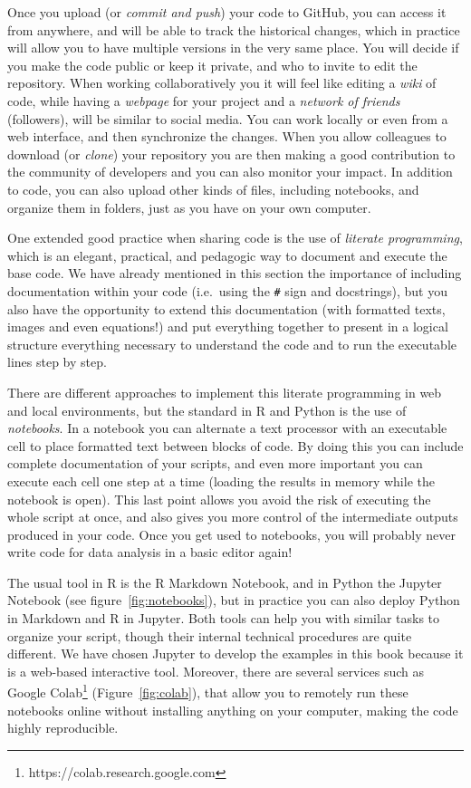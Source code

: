 Once you upload (or \textit{commit and push}) your code to GitHub, you can access it from anywhere, and will be able to track the historical changes, which in practice will allow you to have multiple versions in the very same place. You will decide if you make the code public or keep it private, and who to invite to edit the repository. When working collaboratively you it will feel like editing a \textit{wiki} of code, while having a \textit{webpage} for your project and a \textit{network of friends} (followers), will be similar to social media. You can work locally or even from a web interface, and then synchronize the changes. When you allow colleagues to download (or \textit{clone}) your repository you are then making a good contribution to the community of developers and you can also monitor your impact. In addition to code, you can also upload other kinds of files, including notebooks, and organize them in folders, just as you have  on your own computer.

One extended good practice when sharing code is the use of \textit{literate programming}, which is an elegant, practical, and pedagogic way to document and execute the base code. We have already mentioned in this section the importance of including documentation within your code (i.e.\ using the \texttt{\#} sign and docstrings), but you also have the opportunity to extend this documentation (with formatted texts, images and even equations!) and put everything together to present in a logical structure everything necessary to understand the code and to run the executable lines step by step.

There are different approaches to implement this literate programming in web and local environments, but the standard in R and Python is the use of \textit{notebooks}. In a notebook you can alternate a text processor with an executable cell to place formatted text between blocks of code. By doing this you can include complete documentation of your scripts, and even more important you can execute each cell one step at a time (loading the results in memory while the notebook is open). This last point allows you avoid the risk of executing the whole script at once, and also gives you more control of the intermediate outputs produced in your code. Once you get used to notebooks, you will probably never write code for data analysis in a basic editor again!

The usual tool in R is the R Markdown Notebook, and in Python the Jupyter Notebook (see figure~\ref{fig:notebooks}), but in practice you can also deploy Python in Markdown and R in Jupyter. Both tools can help you with similar tasks to organize your script, though their internal technical procedures are quite different. We have chosen Jupyter to develop the examples in this book because it is a web-based interactive tool. Moreover, there are several services such as Google Colab\footnote{https://colab.research.google.com} (Figure~\ref{fig:colab}), that allow you to remotely run these notebooks online without installing anything on your computer, making the code highly reproducible.

